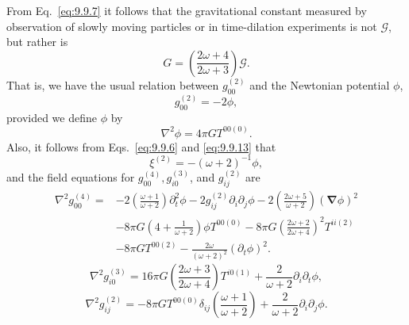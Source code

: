 From Eq.~\eqref{eq:9.9.7} it follows that the gravitational constant
measured by observation of slowly moving particles or in time-dilation
experiments is not \(\mathcal G\), but rather is
\begin{equation}
  G=
  \left(\frac{2\omega+4}{2\omega+3}\right)\mathcal G.
  \tag{9.9.11}\label{eq:9.9.11}
\end{equation}
That is, we have the usual relation between \(g_{00}^{(2)}\) and the
Newtonian potential \(\phi\),
\begin{equation}
  g_{00}^{(2)}=-2\phi,
  \tag{9.9.12}\label{eq:9.9.12}
\end{equation}
provided we define \(\phi\) by
\begin{equation}
  \nabla^2\phi=4\pi G T^{00(0)}.
  \tag{9.9.13}\label{eq:9.9.13}
\end{equation}
Also, it follows from Eqs.~\eqref{eq:9.9.6} and \eqref{eq:9.9.13} that
\[
  \xi^{(2)}=-(\omega+2)^{-1}\phi,
\]
and the field equations for \(g_{00}^{(4)},g_{i0}^{(3)}\), and
\(g_{ij}^{(2)}\) are
\begin{equation}
  \begin{split}
  \nabla^2g_{00}^{(4)}
  ={}&
  -2\left(\frac{\omega+1}{\omega+2}\right)\partial_t^2\phi
  -2g_{ij}^{(2)}\partial_i\partial_j\phi
  -2\left(\frac{2\omega+5}{\omega+2}\right)
   (\boldsymbol\nabla\phi)^2\\
  &-8\pi G\left(4+\frac1{\omega+2}\right)
   \phi T^{00(0)}
  -8\pi G\left(\frac{2\omega+2}{2\omega+4}\right)^2T^{ii(2)}\\
  &-8\pi G T^{00(2)}
  -\frac{2\omega}{(\omega+2)^2}(\partial_t\phi)^2.
  \end{split}
  \tag{9.9.14}\label{eq:9.9.14}
\end{equation}
\begin{equation}
  \nabla^2g_{i0}^{(3)}
  =
  16\pi G
  \left(\frac{2\omega+3}{2\omega+4}\right)T^{i0(1)}
  +\frac{2}{\omega+2}\partial_i\partial_t\phi,
  \tag{9.9.15}\label{eq:9.9.15}
\end{equation}
\begin{equation}
  \nabla^2g_{ij}^{(2)}
  =
  -8\pi G T^{00(0)}\delta_{ij}
   \left(\frac{\omega+1}{\omega+2}\right)
  +\frac{2}{\omega+2}\partial_i\partial_j\phi.
  \tag{9.9.16}\label{eq:9.9.16}
\end{equation}

